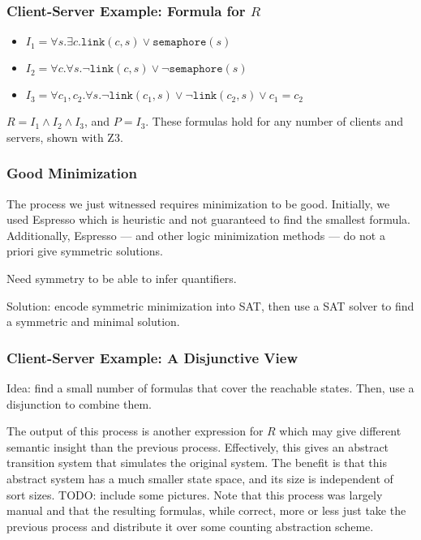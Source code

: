 \documentclass{beamer}
\begin{document}
\begin{frame}
    \frametitle{Client-Server Example: Formula for $R$}
    \begin{itemize}
        \item $I_1 = \forall s . \exists c .  \texttt{link}(c, s) \lor \texttt{semaphore}(s)$
        \item $I_2 = \forall c . \forall s . \neg \texttt{link}(c, s) \lor \neg \texttt{semaphore}(s)$
        \item $I_3 = \forall c_1, c_2 . \forall s. \neg \texttt{link}(c_1, s) \lor \neg \texttt{link}(c_2, s) \lor c_1 = c_2$
    \end{itemize}
    $R = I_1 \land I_2 \land I_3$, and $P = I_3$. These formulas hold for any number of clients and servers, shown with Z3.
\end{frame}

\begin{frame}
    \frametitle{Good Minimization}
    The process we just witnessed requires minimization to be good. Initially, we used Espresso which is heuristic and not guaranteed to find the smallest formula. Additionally, Espresso --- and other logic minimization methods --- do not a priori give symmetric solutions. 

    Need symmetry to be able to infer quantifiers. 
    
    Solution: encode symmetric minimization into SAT, then use a SAT solver to find a symmetric and minimal solution.
\end{frame}

\begin{frame}
    \frametitle{Client-Server Example: A Disjunctive View}
    Idea: find a small number of formulas that cover the reachable states. Then, use a disjunction to combine them.

    The output of this process is another expression for $R$ which may give different semantic insight than the previous process. Effectively, this gives an abstract transition system that simulates the original system. The benefit is that this abstract system has a much smaller state space, and its size is independent of sort sizes.
    TODO: include some pictures. Note that this process was largely manual and that the resulting formulas, while correct, more or less just take the previous process and distribute it over some counting abstraction scheme.
\end{frame}
\end{document}
